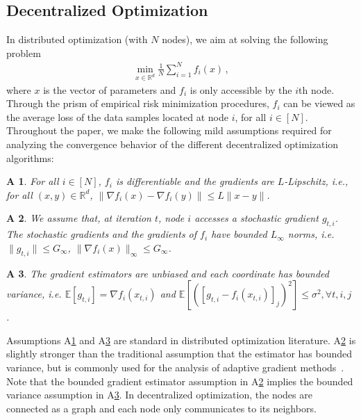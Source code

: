 \documentclass[11pt]{article}
\newtheorem{assumptionA}{A\!\!}
\begin{document}
\subsection{Decentralized Optimization }


In distributed optimization (with $N$ nodes), we aim at solving the following problem
\begin{align}\label{eq:minproblem}
\min_{x \in \mathbb{R}^d} \frac{1}{N}\sum_{i=1}^N f_i(x) \, ,
\end{align}
where $x$ is the vector of parameters and $f_i$ is only accessible by the $i$th node. 
Through the prism of empirical risk minimization procedures, $f_i$ can be viewed as the average loss of the data samples located at node $i$, for all $i \in [N]$. 
Throughout the paper, we make the following mild assumptions required for analyzing the convergence behavior of the different decentralized optimization algorithms:
\begin{assumptionA}\label{a:diff}
For all $i \in [N]$, $f_i$ is differentiable and the gradients are $L$-Lipschitz, i.e., for all $(x, y) \in \mathbb{R}^d$, $\|\nabla f_i(x) - \nabla f_i(y) \| \leq L\|x-y\|$.
\end{assumptionA}
\begin{assumptionA}\label{a:boundsto}
We assume that, at iteration $t$, node $i$ accesses a stochastic gradient $g_{t,i}$. The stochastic gradients and the gradients of $f_i$ have bounded $L_{\infty}$ norms, i.e. $\|g_{t,i}\| \leq G_{\infty}$, $\|\nabla f_i(x)\|_{\infty} \leq G_{\infty}$. 
\end{assumptionA}
\begin{assumptionA}\label{a:boundedvar}
The gradient estimators are unbiased and each coordinate has bounded variance, i.e. $\mathbb E [g_{t,i}] = \nabla f_i(x_{t,i}) $ and $\mathbb E [([g_{t,i} - f_i(x_{t,i})]_j)^2] \leq  \sigma^2, \forall t,i,j$ . 
\end{assumptionA}
Assumptions A\ref{a:diff} and A\ref{a:boundedvar} are standard in distributed optimization literature. A\ref{a:boundsto} is slightly stronger than the traditional assumption that the estimator has bounded variance, but is commonly used for the analysis of adaptive gradient methods~\citep{chen2018convergence,ward2019adagrad}. 
Note that the bounded gradient estimator assumption in A\ref{a:boundsto} implies the bounded variance assumption in A\ref{a:boundedvar}.
In decentralized optimization, the nodes are connected as a graph and each node only communicates to its neighbors. 
\end{document}
